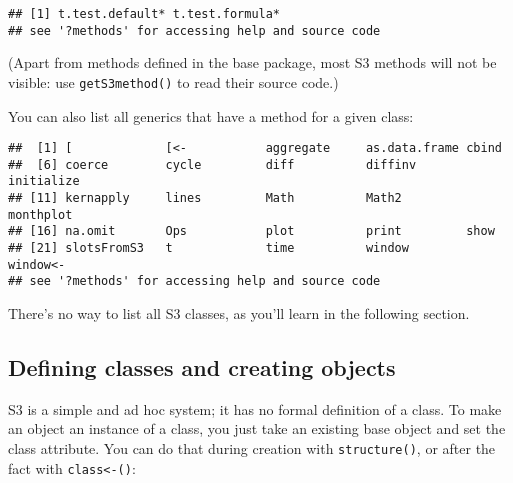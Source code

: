 \begin{Shaded}
\begin{Highlighting}[]
\NormalTok{(}\NormalTok{)}
\end{Highlighting}
\end{Shaded}

\begin{verbatim}
## [1] t.test.default* t.test.formula*
## see '?methods' for accessing help and source code
\end{verbatim}

(Apart from methods defined in the base package, most S3 methods will
not be visible: use \texttt{getS3method()} to read their source code.)

You can also list all generics that have a method for a given class:

\begin{Shaded}
\begin{Highlighting}[]
\NormalTok{(} \NormalTok{)}
\end{Highlighting}
\end{Shaded}

\begin{verbatim}
##  [1] [             [<-           aggregate     as.data.frame cbind        
##  [6] coerce        cycle         diff          diffinv       initialize   
## [11] kernapply     lines         Math          Math2         monthplot    
## [16] na.omit       Ops           plot          print         show         
## [21] slotsFromS3   t             time          window        window<-     
## see '?methods' for accessing help and source code
\end{verbatim}

There's no way to list all S3 classes, as you'll learn in the following
section.

\hypertarget{defining-classes-and-creating-objects}{%
\subsection{Defining classes and creating
objects}\label{defining-classes-and-creating-objects}}

S3 is a simple and ad hoc system; it has no formal definition of a
class. To make an object an instance of a class, you just take an
existing base object and set the class attribute. You can do that during
creation with \texttt{structure()}, or after the fact with
\texttt{class\textless{}-()}:  

